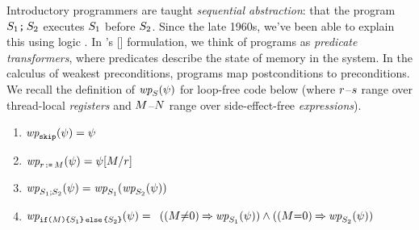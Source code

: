 Introductory programmers are taught \emph{sequential abstraction}: that the
program $S_1\texttt{;}\,\allowbreak S_2$ executes $S_1$ before $S_2$.  Since
the late 1960s, we've been able to explain this using logic
\citep{Hoare:1969:ABC:363235.363259}.  In
\citeauthor{DBLP:journals/cacm/Dijkstra75}'s
[\citeyear{DBLP:journals/cacm/Dijkstra75}] formulation, we think of programs
as \emph{predicate transformers}, where predicates describe the state of
memory in the system.  In the calculus of weakest preconditions, programs map
postconditions to preconditions.  We recall the definition of
$\fwp{\aCmd}{\bForm}$ for loop-free code below (where $r$--$s$ range over thread-local \emph{registers}
and $M$--$N$ range over side-effect-free \emph{expressions}). 
  \begin{enumerate}[,label=(\textsc{d}\arabic*),ref=\textsc{d}\arabic*]
  \item
    \begin{math}
      \fwp{\SKIP}{\bForm} = \bForm
    \end{math}
  \item \label{wp-let}
    $\fwp{\LET{\aReg}{\aExp}}{\bForm} = \bForm[\aExp/\aReg]$
  \item
    \begin{math}
      \fwp{\aCmd_1;\aCmd_2}{\bForm} = \fwp{\aCmd_1}{\fwp{\aCmd_2}{\bForm}}
    \end{math}
  \item
    \begin{math}
      \fwp{\IF{\aExp}\THEN \aCmd_1\ELSE \aCmd_2\FI}{\bForm}= {}
    \end{math}
    \begin{math}
      ((\aExp{\ne}0) \limplies \fwp{\aCmd_1}{\bForm}) \land
      ((\aExp{=}0) \limplies \fwp{\aCmd_2}{\bForm})
    \end{math}
  \end{enumerate}

